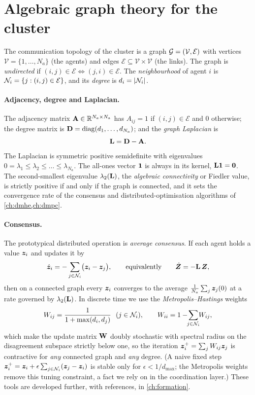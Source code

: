 \section{Algebraic graph theory for the cluster}
\label{sec:graph}

The communication topology of the cluster is a graph $\mathcal{G}=(\mathcal V,\mathcal E)$
with vertices $\mathcal V=\{1,\dots,N_a\}$ (the agents) and edges
$\mathcal E\subseteq\mathcal V\times\mathcal V$ (the links). The graph is
\emph{undirected} if $(i,j)\in\mathcal E\Leftrightarrow(j,i)\in\mathcal E$. The
\emph{neighbourhood} of agent $i$ is $\mathcal{N}_i=\{j:(i,j)\in\mathcal E\}$, and its
\emph{degree} is $d_i=\left\lvert \mathcal{N}_i \right\rvert$.

\paragraph{Adjacency, degree and Laplacian.} The adjacency matrix
$\mathbf{A}\in\mathbb{R}^{N_a\times N_a}$ has $A_{ij}=1$ if $(i,j)\in\mathcal E$ and $0$
otherwise; the degree matrix is $\mathbf{D}=\operatorname{diag}(d_1,\dots,d_{N_a})$; and the
\emph{graph Laplacian} is
\begin{equation}
\mathbf{L}=\mathbf{D}-\mathbf{A}.
\label{eq:laplacian}
\end{equation}
The Laplacian is symmetric positive semidefinite with eigenvalues
$0=\lambda_1\le\lambda_2\le\dots\le\lambda_{N_a}$. The all-ones vector
$\bm{1}$ is always in its kernel, $\mathbf{L}\bm{1}=\bm{0}$. The second-smallest
eigenvalue $\lambda_2(\mathbf{L})$, the \emph{algebraic connectivity} or Fiedler value,
is strictly positive if and only if the graph is connected, and it sets the
convergence rate of the consensus and distributed-optimisation algorithms of
\cref{ch:dmhe,ch:dmpc}.

\paragraph{Consensus.} The prototypical distributed operation is
\emph{average consensus}. If each agent holds a value $\bm{z}_i$ and updates it
by
\begin{equation}
\dot{\bm{z}}_i=-\sum_{j\in\mathcal{N}_i}\bigl(\bm{z}_i-\bm{z}_j\bigr),
\qquad\text{equivalently}\qquad
\dot{\bm{Z}}=-\mathbf{L}\,\bm{Z},
\label{eq:consensus}
\end{equation}
then on a connected graph every $\bm{z}_i$ converges to the average
$\tfrac1{N_a}\sum_j\bm{z}_j(0)$ at a rate governed by $\lambda_2(\mathbf{L})$. In
discrete time we use the \emph{Metropolis--Hastings} weights
\begin{equation}
W_{ij}=\frac{1}{1+\max(d_i,d_j)}\ \ (j\in\Neigh_i),\qquad
W_{ii}=1-\!\!\sum_{j\in\Neigh_i}\!\!W_{ij},
\label{eq:metropolis}
\end{equation}
which make the update matrix $\mathbf{W}$ doubly stochastic with spectral radius on
the disagreement subspace strictly below one, so the iteration
$\bm{z}_i^{+}=\sum_j W_{ij}\bm{z}_j$ is contractive for \emph{any} connected
graph and \emph{any} degree. (A naive fixed step $\bm{z}_i^{+}=\bm{z}_i
+\epsilon\sum_{j\in\mathcal{N}_i}(\bm{z}_j-\bm{z}_i)$ is stable only for
$\epsilon<1/d_{\max}$; the Metropolis weights remove this tuning constraint, a
fact we rely on in the coordination layer.) These tools are developed further,
with references, in \cref{ch:formation}.
